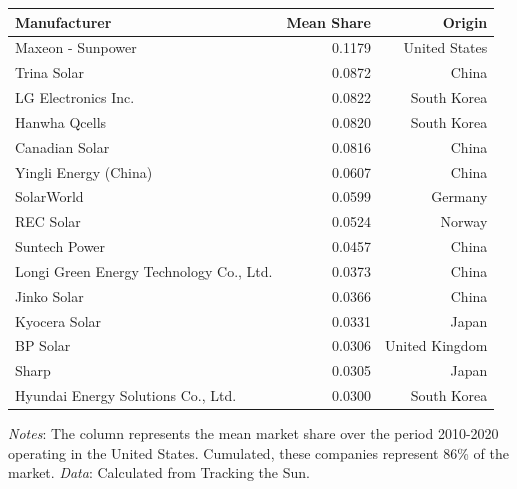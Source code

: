 \begin{table}[H]
\fontsize{12.0pt}{14.4pt}\selectfont
\centering
\begin{tabular*}{\linewidth}{@{\extracolsep{\fill}}lrr}  
\toprule
Manufacturer & Mean Share & Origin \\  
\midrule\addlinespace[2.5pt]
Maxeon - Sunpower & 0.1179 & United States \\  
Trina Solar & 0.0872 & China \\  
LG Electronics Inc. & 0.0822 & South Korea \\  
Hanwha Qcells & 0.0820 & South Korea \\  
Canadian Solar & 0.0816 & China \\  
Yingli Energy (China) & 0.0607 & China \\  
SolarWorld & 0.0599 & Germany \\  
REC Solar & 0.0524 & Norway \\  
Suntech Power & 0.0457 & China \\  
Longi Green Energy Technology Co., Ltd. & 0.0373 & China \\  
Jinko Solar & 0.0366 & China \\  
Kyocera Solar & 0.0331 & Japan \\  
BP Solar & 0.0306 & United Kingdom \\  
Sharp & 0.0305 & Japan \\  
Hyundai Energy Solutions Co., Ltd. & 0.0300 & South Korea \\  
\bottomrule
\end{tabular*}

\vspace{5pt}  %
\begin{minipage}{\linewidth}
\footnotesize
\textit{Notes}: The column represents the mean market share over the period 2010-2020 operating in the United States. Cumulated, these companies represent 86\% of the market. \newline
\textit{Data}: Calculated from Tracking the Sun.
\end{minipage}
\end{table}